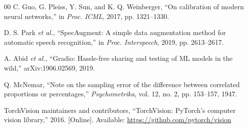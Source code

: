 \begin{thebibliography}{00}
 C. Guo, G. Pleiss, Y. Sun, and K. Q. Weinberger, ``On calibration of modern neural networks,'' in \emph{Proc. ICML}, 2017, pp. 1321--1330.

 D. S. Park \emph{et al.}, ``SpecAugment: A simple data augmentation method for automatic speech recognition,'' in \emph{Proc. Interspeech}, 2019, pp. 2613--2617.

 A. Abid \emph{et al.}, ``Gradio: Hassle-free sharing and testing of ML models in the wild,'' arXiv:1906.02569, 2019.

 Q. McNemar, ``Note on the sampling error of the difference between correlated proportions or percentages,'' \emph{Psychometrika}, vol. 12, no. 2, pp. 153--157, 1947.

 TorchVision maintainers and contributors, ``TorchVision: PyTorch's computer vision library,'' 2016. [Online]. Available: \url{https://github.com/pytorch/vision}

\end{thebibliography}
